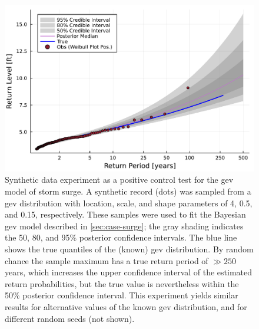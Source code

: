 \documentclass[ef,draft]{agutexSI2019}
\begin{document}
\begin{figure}
      \centering
      \includegraphics[width=\textwidth]{surge-synthetic-data-experiment}
      \caption{
            Synthetic data experiment as a positive control test for the \gls{gev} model of storm surge.
            A synthetic record (dots) was sampled from a \gls{gev} distribution with location, scale, and shape parameters of 4, 0.5, and 0.15, respectively.
            These samples were used to fit the Bayesian \gls{gev} model described in \cref{sec:case-surge}; the gray shading indicates the 50, 80, and 95\% posterior confidence intervals.
            The blue line shows the true quantiles of the (known) \gls{gev} distribution.
            By random chance the sample maximum has a true return period of $\gg 250$ years, which increases the upper confidence interval of the estimated return probabilities, but the true value is nevertheless within the 50\% posterior confidence interval.
            This experiment yields similar results for alternative values of the known \gls{gev} distribution, and for different random seeds (not shown).
      }\label{fig:surge-synthetic-data-experiment}
\end{figure}
\end{document}
